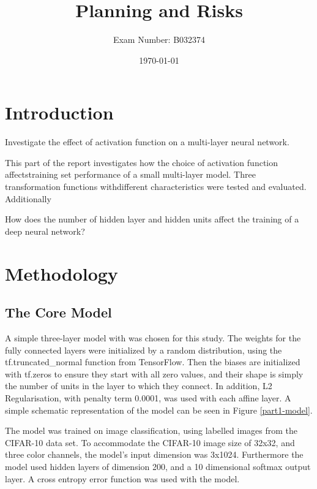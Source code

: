 \documentclass[]{article}
\title{Planning and Risks}
\author{Exam Number: B032374}
\date{\today}
\begin{document}
\maketitle

\section{Introduction}

Investigate the effect of activation function on a multi-layer neural network.

This part of the report investigates how the choice of activation function affectstraining set performance of a small multi-layer model. Three transformation functions withdifferent characteristics were tested and evaluated.
Additionally

How does the number of hidden layer and hidden units affect the training of a deep neural network?



\section{Methodology}

\subsection{The Core Model}

A simple three-layer model with was chosen for this study. The weights for the fully connected layers were initialized by a random distribution, using the tf.truncated\_normal function from TensorFlow. Then the biases are initialized with tf.zeros to ensure they start with all zero values, and their shape is simply the number of units in the layer to which they connect. In addition, L2 Regularisation, with penalty term 0.0001, was used with each affine layer. A simple schematic representation of the model can be seen in Figure \ref{part1-model}.

The model was trained on image classification, using labelled images from the CIFAR-10 data set. To accommodate the CIFAR-10 image size of 32x32, and three color channels, the model's input dimension was 3x1024. Furthermore the model used hidden layers of dimension 200, and a 10 dimensional softmax output layer. A cross entropy error function was used with the model.
\end{document}
